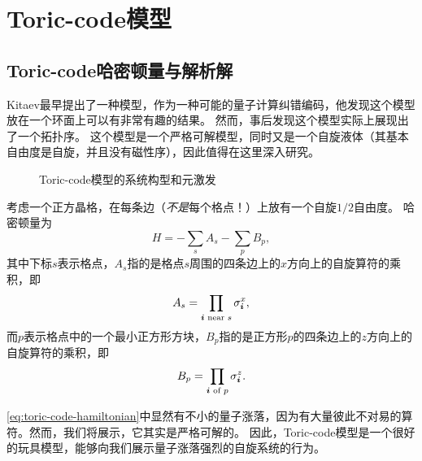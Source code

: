 \section{Toric-code模型}

\subsection{Toric-code哈密顿量与解析解}

Kitaev最早提出了一种模型，作为一种可能的量子计算纠错编码，他发现这个模型放在一个环面上可以有非常有趣的结果。
然而，事后发现这个模型实际上展现出了一个拓扑序。
这个模型是一个严格可解模型，同时又是一个自旋液体（其基本自由度是自旋，并且没有磁性序），因此值得在这里深入研究。

\begin{figure}
    \centering
    \vfill
    \caption{Toric-code模型的系统构型和元激发}
\end{figure}

考虑一个正方晶格，在每条边（\emph{不是}每个格点！）上放有一个自旋$1/2$自由度。
哈密顿量为
\begin{equation}
    {H} = - \sum_s {A}_s - \sum_p {B}_p,
    \label{eq:toric-code-hamiltonian}
\end{equation}
其中下标$s$表示格点，${A}_s$指的是格点$s$周围的四条边上的$x$方向上的自旋算符的乘积，即
\begin{equation}
    {A}_s = \prod_{\vb*{i} \text{ near } s} {\sigma}_{\vb*{i}}^x,
\end{equation}
而$p$表示格点中的一个最小正方形方块，${B}_p$指的是正方形$p$的四条边上的$z$方向上的自旋算符的乘积，即
\begin{equation}
    {B}_p = \prod_\text{$\vb*{i}$ of $p$} {\sigma}_{\vb*{i}}^z.
\end{equation}

\eqref{eq:toric-code-hamiltonian}中显然有不小的量子涨落，因为有大量彼此不对易的算符。然而，我们将展示，它其实是严格可解的。
因此，Toric-code模型是一个很好的玩具模型，能够向我们展示量子涨落强烈的自旋系统的行为。

